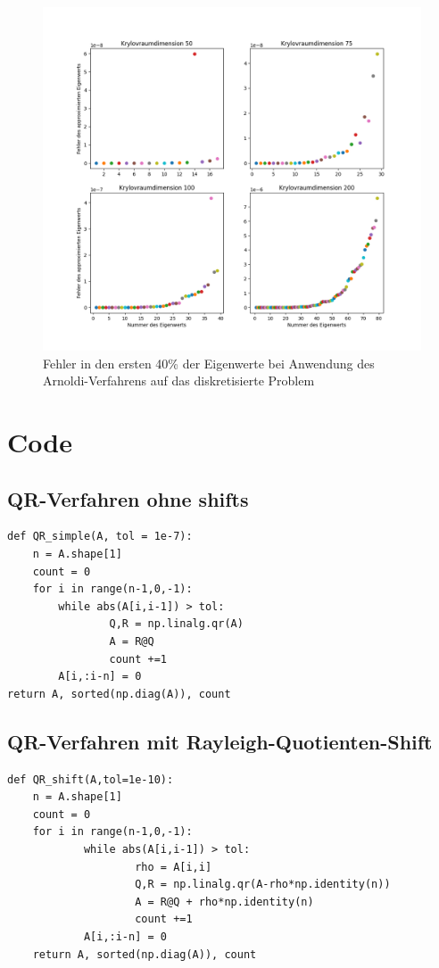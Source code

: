\documentclass{article}
\begin{document}
\begin{theorem}
\begin{figure}\label{error_eigv_laplace}
	\includegraphics[width = 0.9\linewidth]{Plots/error_eigv_laplace}
	\caption{Fehler in den ersten 40\% der Eigenwerte bei Anwendung des Arnoldi-Verfahrens auf das diskretisierte Problem}
\end{figure}
\newpage
\pagestyle{plain}
\section*{Code}

\subsection*{QR-Verfahren ohne shifts}

\begin{lstlisting}
def QR_simple(A, tol = 1e-7):
	n = A.shape[1]
	count = 0
	for i in range(n-1,0,-1):
		while abs(A[i,i-1]) > tol:
				Q,R = np.linalg.qr(A)
				A = R@Q
				count +=1
		A[i,:i-n] = 0
return A, sorted(np.diag(A)), count
\end{lstlisting}



\subsection*{QR-Verfahren mit Rayleigh-Quotienten-Shift}
\begin{lstlisting}
def QR_shift(A,tol=1e-10):
	n = A.shape[1]
	count = 0
	for i in range(n-1,0,-1):
			while abs(A[i,i-1]) > tol:
					rho = A[i,i]
					Q,R = np.linalg.qr(A-rho*np.identity(n))
					A = R@Q + rho*np.identity(n)
					count +=1
			A[i,:i-n] = 0
	return A, sorted(np.diag(A)), count
\end{lstlisting}



\end{theorem}
\end{document}
